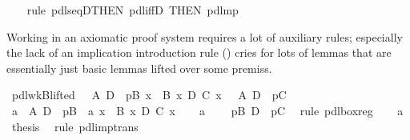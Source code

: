 \begin{isabellebody}
\ \ \isamarkupfalse%
\ {\isacharparenleft}rule\ pdl{\isacharunderscore}seqD{\isacharbrackleft}THEN\ pdl{\isacharunderscore}iffD{}{\isacharcomma}\ THEN\ pdl{\isacharunderscore}mp{\isacharbrackright}{\isacharparenright}\isamarkupfalse%
%
\begin{isamarkuptext}%
Working in an axiomatic proof system requires a lot of auxiliary 
  rules; especially the lack of an implication introduction rule 
  () cries for lots of lemmas that are essentially just
  basic lemmas lifted over some premiss.
  \label{isa:pdl-lifted-lemmas}%
\end{isamarkuptext}%
\isamarkuptrue%
\ pdl{\isacharunderscore}wkB{\isacharunderscore}lifted{}{\isacharcolon}\ {\isachardoublequote}{\isasymlbrakk}\ {\isasymturnstile}\ A\ {\isasymlongrightarrow}\isactrlsub D\ {\isacharbrackleft}{\isacharhash}\ p{\isacharbrackright}B{\isacharsemicolon}\ {\isasymforall}x{\isachardot}\ {\isasymturnstile}\ B\ x\ {\isasymlongrightarrow}\isactrlsub D\ C\ x{\isasymrbrakk}\ {\isasymLongrightarrow}\ {\isasymturnstile}\ A\ {\isasymlongrightarrow}\isactrlsub D\ {\isacharbrackleft}{\isacharhash}\ p{\isacharbrackright}C{\isachardoublequote}\isanewline
\isamarkupfalse%
\ {\isacharminus}\isanewline
\ \ \isamarkupfalse%
\ a{}{\isacharcolon}\ {\isachardoublequote}{\isasymturnstile}\ A\ {\isasymlongrightarrow}\isactrlsub D\ {\isacharbrackleft}{\isacharhash}\ p{\isacharbrackright}B{\isachardoublequote}\ \ a{}{\isacharcolon}\ {\isachardoublequote}{\isasymforall}x{\isachardot}\ {\isasymturnstile}\ B\ x\ {\isasymlongrightarrow}\isactrlsub D\ C\ x{\isachardoublequote}\isanewline
\ \ \isamarkupfalse%
\ a{}\ \isamarkupfalse%
\ {\isachardoublequote}{\isasymturnstile}\ {\isacharbrackleft}{\isacharhash}\ p{\isacharbrackright}B\ {\isasymlongrightarrow}\isactrlsub D\ {\isacharbrackleft}{\isacharhash}\ p{\isacharbrackright}C{\isachardoublequote}\ \isamarkupfalse%
\ {\isacharparenleft}rule\ pdl{\isacharunderscore}box{\isacharunderscore}reg{\isacharparenright}\isanewline
\ \ \isamarkupfalse%
\ a{}\ \isamarkupfalse%
\ {\isacharquery}thesis\ \isamarkupfalse%
\ {\isacharparenleft}rule\ pdl{\isacharunderscore}imp{\isacharunderscore}trans{\isacharparenright}\isanewline
\isamarkupfalse%
\isanewline

\end{isabellebody}
